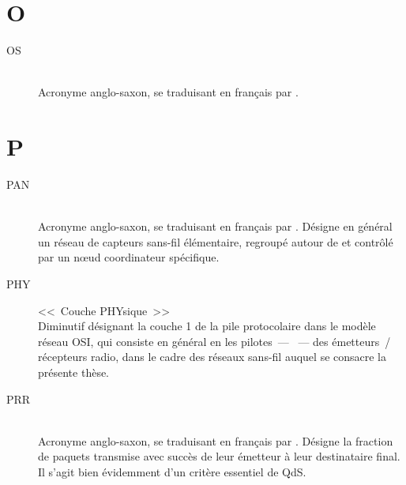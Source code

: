 
\section*{O}

\begin{description}

\item[OS]  \\
Acronyme anglo-saxon, se traduisant en français par .

\end{description}


\section*{P}

\begin{description}

\item[PAN]  \\
Acronyme anglo-saxon, se traduisant en français par . Désigne en général un réseau de capteurs
sans-fil élémentaire, regroupé autour de et contrôlé par un n{\oe}ud
coordinateur spécifique.

\item[PHY] <<~Couche PHYsique~>> \\
Diminutif désignant la couche 1 de la pile protocolaire dans le modèle
réseau OSI, qui consiste en général en les pilotes~--- ~---
des émetteurs~/ récepteurs radio, dans le cadre des réseaux sans-fil auquel
se consacre la présente thèse.

\item[PRR]  \\
Acronyme anglo-saxon, se traduisant en français par . Désigne la fraction de paquets transmise avec
succès de leur émetteur à leur destinataire final. Il s'agit bien évidemment
d'un critère essentiel de QdS.

\end{description}


